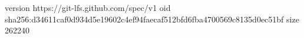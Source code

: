version https://git-lfs.github.com/spec/v1
oid sha256:d34611caf0d934d5e19602c4ef94faecaf512bfd6fba4700569c8135d0ec51bf
size 262240
